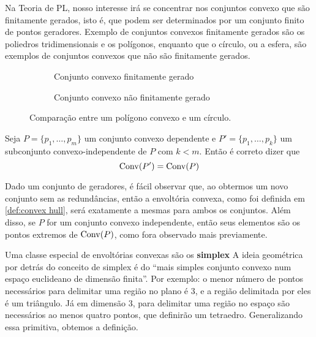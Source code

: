 Na Teoria de PL, nosso interesse irá se concentrar nos conjuntos convexo que são
finitamente gerados, isto é, que podem ser determinados por um conjunto finito
de pontos geradores. Exemplo de conjuntos convexos finitamente gerados são
os poliedros tridimensionais e os polígonos, enquanto que o círculo, ou a esfera,
são exemplos de conjuntos convexos que não são finitamente gerados.

\begin{figure}[h]
\centering
\begin{subfigure}{0.45\textwidth}
	\centering
	\caption{Conjunto convexo finitamente gerado}
	\label{fig:poligono}
\end{subfigure}
\hfill
\begin{subfigure}{0.50\textwidth}
	\centering
	\caption{Conjunto convexo não finitamente gerado}
	\label{fig:circulo}
\end{subfigure}
\caption{Comparação entre um polígono convexo e um círculo.}
\end{figure}

\begin{prop:redundancia}
	Seja $P = \{p_1, \ldots, p_m\}$ um conjunto convexo dependente e
	$P' = \{p_1, \ldots, p_k\}$ um subconjunto convexo-independente
	de $P$ com $k < m$. Então é correto dizer que
	\begin{equation*}
		\mathrm{Conv}(P') = \mathrm{Conv}(P)
	\end{equation*}
\end{prop:redundancia}

Dado um conjunto de geradores, é fácil observar que, ao obtermos um
novo conjunto sem as redundâncias, então a envoltória convexa, como
foi definida em \ref{def:convex hull}, será exatamente a mesmas para
ambos os conjuntos. Além disso, se $P$ for um conjunto convexo
independente, então seus elementos são os pontos extremos de \(\mathrm{Conv}(P)\),
como fora observado mais previamente.

Uma classe especial de envoltórias convexas são os \textbf{simplex}
A ideia geométrica por detrás do conceito de simplex é do ``mais simples
conjunto convexo num espaço euclideano de dimensão finita''. Por exemplo:
o menor número de pontos necessários para delimitar uma região no plano é
3, e a região delimitada por eles é um triângulo. Já em dimensão 3, para
delimitar uma região no espaço são necessários ao menos quatro pontos,
que definirão um tetraedro. Generalizando essa primitiva, obtemos a definição.


